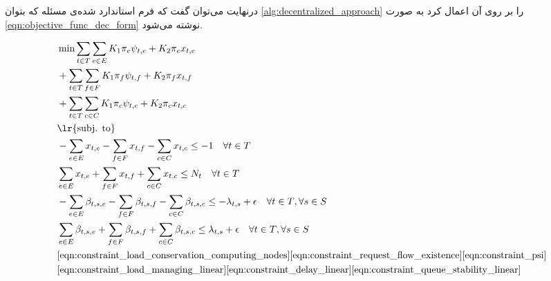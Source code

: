 	درنهایت می‌توان گفت که فرم استاندارد شده‌ی مسئله که بتوان \cref{alg:decentralized_approach} را بر روی آن اعمال کرد به صورت \cref{eqn:objective_func_dec_form} نوشته می‌شود. 
	
	\begin{align}
		&\min \sum_{t \in T}\sum_{e \in E} K_1\pi_e\psi_{t,e}+K_2\pi_ex_{t,e} \notag \\
		&+\sum_{t \in T}\sum_{f \in F} 	K_1\pi_f\psi_{t,f}+K_2\pi_fx_{t,f}\notag \\
		&+\sum_{t \in T}\sum_{c \in C} K_1\pi_c\psi_{t,c}+K_2\pi_cx_{t,c} \label{eqn:objective_func_dec_form} \notag \\
		&\text{\lr{subj. to}} \notag \\
		&-\sum_{e \in E}x_{t,e} - \sum_{f \in F}x_{t,f} - \sum_{c \in C}x_{t,c} \le -1 \quad \forall{t \in T} \notag \\
		&\sum_{e \in E}x_{t,e} + \sum_{f \in F}x_{t,f} + \sum_{c \in C}x_{t,c} \le N_t \quad \forall{t \in T} \notag \\
		&-\sum_{e \in E} \beta_{t,s,e} - \sum_{f \in F} \beta_{t,s,f}
		-\sum_{c \in C}\beta_{t,s,c} \le -\lambda_{t,s}+\epsilon \quad \forall{t \in T}, \forall{s \in S} \notag \\ 
		&\sum_{e \in E} \beta_{t,s,e} + \sum_{f \in F} \beta_{t,s,f}
		+\sum_{c \in C}\beta_{t,s,c} \le \lambda_{t,s}+\epsilon \quad \forall{t \in T}, \forall{s \in S} \notag \\		
		&\cref{eqn:constraint_load_conservation_computing_nodes}
		\cref{eqn:constraint_request_flow_existence}				
		\cref{eqn:constraint_psi} \notag \\
		&\cref{eqn:constraint_load_managing_linear} 
		\cref{eqn:constraint_delay_linear}
		\cref{eqn:constraint_queue_stability_linear}
	\end{align}
	
